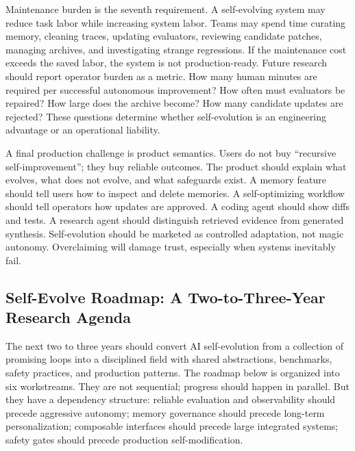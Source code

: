 Maintenance burden is the seventh requirement. A self-evolving system may reduce task labor while increasing system labor. Teams may spend time curating memory, cleaning traces, updating evaluators, reviewing candidate patches, managing archives, and investigating strange regressions. If the maintenance cost exceeds the saved labor, the system is not production-ready. Future research should report operator burden as a metric. How many human minutes are required per successful autonomous improvement? How often must evaluators be repaired? How large does the archive become? How many candidate updates are rejected? These questions determine whether self-evolution is an engineering advantage or an operational liability.

A final production challenge is product semantics. Users do not buy ``recursive self-improvement''; they buy reliable outcomes. The product should explain what evolves, what does not evolve, and what safeguards exist. A memory feature should tell users how to inspect and delete memories. A self-optimizing workflow should tell operators how updates are approved. A coding agent should show diffs and tests. A research agent should distinguish retrieved evidence from generated synthesis. Self-evolution should be marketed as controlled adaptation, not magic autonomy. Overclaiming will damage trust, especially when systems inevitably fail.

\subsection{Self-Evolve Roadmap: A Two-to-Three-Year Research Agenda}
\label{subsec:self-evolve-roadmap}

The next two to three years should convert AI self-evolution from a collection of promising loops into a disciplined field with shared abstractions, benchmarks, safety practices, and production patterns. The roadmap below is organized into six workstreams. They are not sequential; progress should happen in parallel. But they have a dependency structure: reliable evaluation and observability should precede aggressive autonomy; memory governance should precede long-term personalization; composable interfaces should precede large integrated systems; safety gates should precede production self-modification.

